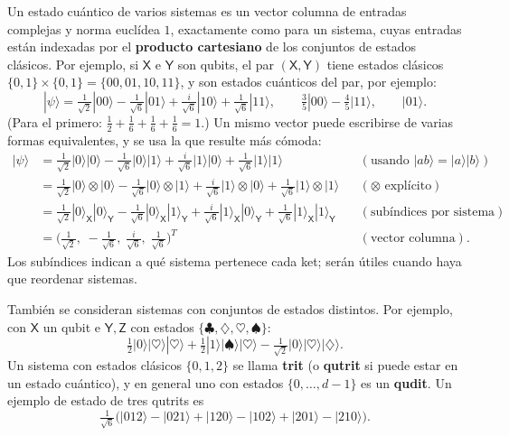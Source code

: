 \documentclass[11pt, a4paper, twoside, openright]{report}
\begin{document}
\noindent Un estado cuántico de varios sistemas es un vector columna de entradas complejas y norma euclídea $1$, exactamente como para un sistema, cuyas entradas están indexadas por el \textbf{producto cartesiano} de los conjuntos de estados clásicos. Por ejemplo, si $\mathsf{X}$ e $\mathsf{Y}$ son qubits, el par $(\mathsf{X},\mathsf{Y})$ tiene estados clásicos $\{0,1\}\times\{0,1\} = \{00, 01, 10, 11\}$, y son estados cuánticos del par, por ejemplo:
\begin{equation}\label{eq:psi2}
|\psi\rangle = \tfrac{1}{\sqrt2}|00\rangle - \tfrac{1}{\sqrt6}|01\rangle + \tfrac{i}{\sqrt6}|10\rangle + \tfrac{1}{\sqrt6}|11\rangle, \qquad \tfrac35|00\rangle - \tfrac45|11\rangle, \qquad |01\rangle.
\end{equation}
(Para el primero: $\frac12 + \frac16 + \frac16 + \frac16 = 1$.) Un mismo vector puede escribirse de varias formas equivalentes, y se usa la que resulte más cómoda:
\begin{align*}
|\psi\rangle &= \tfrac{1}{\sqrt2}|0\rangle|0\rangle - \tfrac{1}{\sqrt6}|0\rangle|1\rangle + \tfrac{i}{\sqrt6}|1\rangle|0\rangle + \tfrac{1}{\sqrt6}|1\rangle|1\rangle & & (\text{usando } |ab\rangle = |a\rangle|b\rangle) \\
&= \tfrac{1}{\sqrt2}|0\rangle\otimes|0\rangle - \tfrac{1}{\sqrt6}|0\rangle\otimes|1\rangle + \tfrac{i}{\sqrt6}|1\rangle\otimes|0\rangle + \tfrac{1}{\sqrt6}|1\rangle\otimes|1\rangle & & (\otimes \text{ explícito}) \\
&= \tfrac{1}{\sqrt2}|0\rangle_{\mathsf{X}}|0\rangle_{\mathsf{Y}} - \tfrac{1}{\sqrt6}|0\rangle_{\mathsf{X}}|1\rangle_{\mathsf{Y}} + \tfrac{i}{\sqrt6}|1\rangle_{\mathsf{X}}|0\rangle_{\mathsf{Y}} + \tfrac{1}{\sqrt6}|1\rangle_{\mathsf{X}}|1\rangle_{\mathsf{Y}} & & (\text{subíndices por sistema}) \\
&= \Big(\tfrac{1}{\sqrt2},\; -\tfrac{1}{\sqrt6},\; \tfrac{i}{\sqrt6},\; \tfrac{1}{\sqrt6}\Big)^T & & (\text{vector columna}).
\end{align*}
Los subíndices indican a qué sistema pertenece cada ket; serán útiles cuando haya que reordenar sistemas.

\noindent También se consideran sistemas con conjuntos de estados distintos. Por ejemplo, con $\mathsf{X}$ un qubit e $\mathsf{Y}, \mathsf{Z}$ con estados $\{\clubsuit,\diamondsuit,\heartsuit,\spadesuit\}$:
\[ \tfrac12|0\rangle|\heartsuit\rangle|\heartsuit\rangle + \tfrac12|1\rangle|\spadesuit\rangle|\heartsuit\rangle - \tfrac{1}{\sqrt2}|0\rangle|\heartsuit\rangle|\diamondsuit\rangle. \]
Un sistema con estados clásicos $\{0,1,2\}$ se llama \textbf{trit} (o \textbf{qutrit} si puede estar en un estado cuántico), y en general uno con estados $\{0,\dots,d-1\}$ es un \textbf{qudit}. Un ejemplo de estado de tres qutrits es
\[ \tfrac{1}{\sqrt6}\big(|012\rangle - |021\rangle + |120\rangle - |102\rangle + |201\rangle - |210\rangle\big). \]
\end{document}
